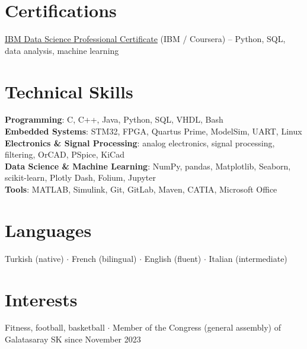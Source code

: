 \documentclass[a4paper,10pt]{article}
\begin{document}
\section{Certifications}
 \begin{itemize}[leftmargin=0.15in, label={}]
    \small{\item{
      \href{https://www.coursera.org/account/accomplishments/professional-cert/PTRTL7GBN782}{\underline{IBM Data Science Professional Certificate}}
      (IBM / Coursera) -- Python, SQL, data analysis, machine learning
    }}
 \end{itemize}

\section{Technical Skills}
 \begin{itemize}[leftmargin=0.15in, label={}]
    \small{\item{
     \textbf{Programming}{: C, C++, Java, Python, SQL, VHDL, Bash} \\
     \textbf{Embedded Systems}{: STM32, FPGA, Quartus Prime, ModelSim, UART, Linux} \\
     \textbf{Electronics \& Signal Processing}{: analog electronics, signal processing, filtering, OrCAD, PSpice, KiCad} \\
     \textbf{Data Science \& Machine Learning}{: NumPy, pandas, Matplotlib, Seaborn, scikit-learn, Plotly Dash, Folium, Jupyter} \\
     \textbf{Tools}{: MATLAB, Simulink, Git, GitLab, Maven, CATIA, Microsoft Office}
    }}
 \end{itemize}

\section{Languages}
 \begin{itemize}[leftmargin=0.15in, label={}]
    \small{\item{
      Turkish (native) $\cdot$
      French (bilingual) $\cdot$
      English (fluent) $\cdot$
      Italian (intermediate)
    }}
 \end{itemize}

\section{Interests}
 \begin{itemize}[leftmargin=0.15in, label={}]
    \small{\item{
      Fitness, football, basketball $\cdot$
      Member of the Congress (general assembly) of Galatasaray SK since November 2023
    }}
 \end{itemize}

\end{document}
